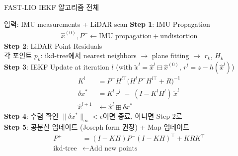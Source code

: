 \begin{frame}[shrink=10]{FAST-LIO IEKF 알고리즘 전체}
  \begin{block}{입력: IMU measurements + LiDAR scan}
    \textbf{Step 1}: IMU Propagation
    \begin{align*}
      \hat{x}^{(0)}, P^- \leftarrow
      \text{IMU propagation} + \text{undistortion}
    \end{align*}
    \textbf{Step 2}: LiDAR Point Residuals\\
    각 포인트 $p_k$: ikd-tree에서 nearest neighbors $\to$ plane fitting $\to$ $r_k$, $H_k$\\[4pt]
    \textbf{Step 3}: IEKF Update at iteration $l$ (with $\tilde{x}^l = \hat{x}^l \boxminus \hat{x}^{(0)}$, $r^l = z - h(\hat{x}^l)$)
    \begin{align*}
      K^l &= P^- H^{l\top}\bigl(H^l P^- H^{l\top} + R\bigr)^{-1}\\
      \delta x^* &= K^l\, r^l \;-\; (I - K^l H^l)\,\tilde{x}^l\\
      \hat{x}^{l+1} &\leftarrow \hat{x}^l \boxplus \delta x^*
    \end{align*}
    \textbf{Step 4}: 수렴 확인 $\|\delta x^*\|_\infty < \epsilon$이면 종료, 아니면 Step 2로\\[4pt]
    \textbf{Step 5}: 공분산 업데이트 (Joseph form 권장) + Map 업데이트
    \begin{align*}
      P^+ &= (I - K H)P^-(I - KH)^\top + KRK^\top\\
      \text{ikd-tree} &\leftarrow \text{Add new points}
    \end{align*}
  \end{block}
\end{frame}

